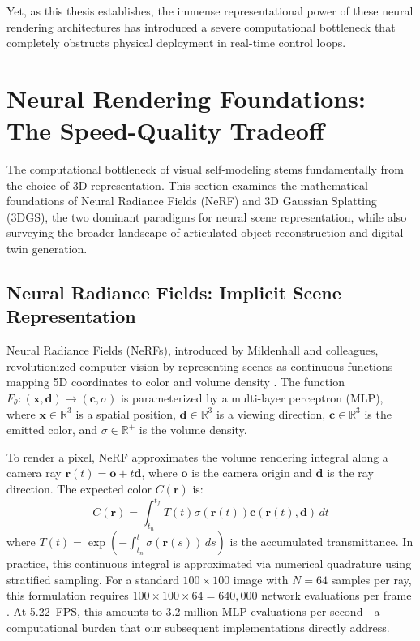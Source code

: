 \documentclass[12pt,a4paper,oneside]{report}
\begin{document}
Yet, as this thesis establishes, the immense representational power of these neural rendering architectures has introduced a severe computational bottleneck that completely obstructs physical deployment in real-time control loops.

\section{Neural Rendering Foundations: The Speed-Quality Tradeoff}
\label{sec:neural_rendering_foundations}

The computational bottleneck of visual self-modeling stems fundamentally from the choice of 3D representation. This section examines the mathematical foundations of Neural Radiance Fields (NeRF) and 3D Gaussian Splatting (3DGS), the two dominant paradigms for neural scene representation, while also surveying the broader landscape of articulated object reconstruction and digital twin generation.

\subsection{Neural Radiance Fields: Implicit Scene Representation}
Neural Radiance Fields (NeRFs), introduced by Mildenhall and colleagues, revolutionized computer vision by representing scenes as continuous functions mapping 5D coordinates to color and volume density \cite{mildenhall2020nerf}. The function $F_\theta: (\mathbf{x}, \mathbf{d}) \rightarrow (\mathbf{c}, \sigma)$ is parameterized by a multi-layer perceptron (MLP), where $\mathbf{x} \in \mathbb{R}^3$ is a spatial position, $\mathbf{d} \in \mathbb{R}^3$ is a viewing direction, $\mathbf{c} \in \mathbb{R}^3$ is the emitted color, and $\sigma \in \mathbb{R}^+$ is the volume density.

To render a pixel, NeRF approximates the volume rendering integral along a camera ray $\mathbf{r}(t) = \mathbf{o} + t\mathbf{d}$, where $\mathbf{o}$ is the camera origin and $\mathbf{d}$ is the ray direction. The expected color $C(\mathbf{r})$ is:
\begin{equation}
C(\mathbf{r}) = \int_{t_n}^{t_f} T(t) \sigma(\mathbf{r}(t)) \mathbf{c}(\mathbf{r}(t), \mathbf{d}) \, dt
\end{equation}
where $T(t) = \exp\left(-\int_{t_n}^{t} \sigma(\mathbf{r}(s)) \, ds\right)$ is the accumulated transmittance. In practice, this continuous integral is approximated via numerical quadrature using stratified sampling. For a standard $100 \times 100$ image with $N = 64$ samples per ray, this formulation requires $100 \times 100 \times 64 = 640,000$ network evaluations per frame \cite{mildenhall2020nerf}. At 5.22~FPS, this amounts to 3.2 million MLP evaluations per second---a computational burden that our subsequent implementations directly address.
\end{document}
